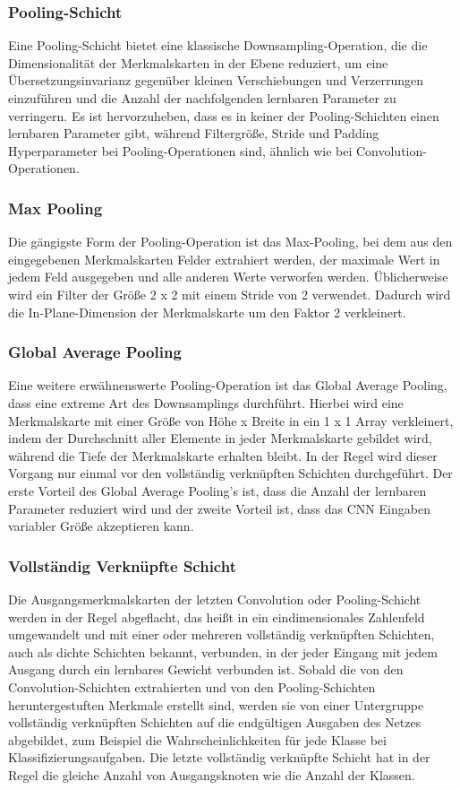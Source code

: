 \documentclass[paper=A4,pagesize=auto,12pt,headinclude=true,footinclude=true,BCOR=0mm,DIV=calc]{scrartcl}
\begin{document}
\subsubsection{Pooling-Schicht}
Eine Pooling-Schicht bietet eine klassische Downsampling-Operation, die die Dimensionalität der Merkmalskarten in der Ebene reduziert, um eine Übersetzungsinvarianz gegenüber kleinen Verschiebungen und Verzerrungen einzuführen und die Anzahl der nachfolgenden lernbaren Parameter zu verringern. Es ist hervorzuheben, dass es in keiner der Pooling-Schichten einen lernbaren Parameter gibt, während Filtergröße, Stride und Padding Hyperparameter bei Pooling-Operationen sind, ähnlich wie bei Convolution-Operationen.\cite{cnn2}

\subsubsection{Max Pooling}
Die gängigste Form der Pooling-Operation ist das Max-Pooling, bei dem aus den eingegebenen Merkmalskarten Felder extrahiert werden, der maximale Wert in jedem Feld ausgegeben und alle anderen Werte verworfen werden. Üblicherweise wird ein Filter der Größe 2 x 2 mit einem Stride von 2 verwendet. Dadurch wird die In-Plane-Dimension der Merkmalskarte um den Faktor 2 verkleinert.\cite{cnn2}

\subsubsection{Global Average Pooling}
Eine weitere erwähnenswerte Pooling-Operation ist das Global Average Pooling, dass eine extreme Art des Downsamplings durchführt. Hierbei wird eine Merkmalskarte mit einer Größe von Höhe x Breite in ein 1 x 1 Array verkleinert, indem der Durchschnitt aller Elemente in jeder Merkmalskarte gebildet wird, während die Tiefe der Merkmalskarte erhalten bleibt. In der Regel wird dieser Vorgang nur einmal vor den vollständig verknüpften Schichten durchgeführt. Der erste Vorteil des Global Average Pooling’s ist, dass die Anzahl der lernbaren Parameter reduziert wird und der zweite Vorteil ist, dass das CNN Eingaben variabler Größe akzeptieren kann.\cite{cnn2}

\subsubsection{Vollständig Verknüpfte Schicht}
Die Ausgangsmerkmalskarten der letzten Convolution oder Pooling-Schicht werden in der Regel abgeflacht, das heißt in ein eindimensionales Zahlenfeld umgewandelt und mit einer oder mehreren vollständig verknüpften Schichten, auch als dichte Schichten bekannt, verbunden, in der jeder Eingang mit jedem Ausgang durch ein lernbares Gewicht verbunden ist. Sobald die von den Convolution-Schichten extrahierten und von den Pooling-Schichten heruntergestuften Merkmale erstellt sind, werden sie von einer Untergruppe vollständig verknüpften Schichten auf die endgültigen Ausgaben des Netzes abgebildet, zum Beispiel die Wahrscheinlichkeiten für jede Klasse bei Klassifizierungsaufgaben. Die letzte vollständig verknüpfte Schicht hat in der Regel die gleiche Anzahl von Ausgangsknoten wie die Anzahl der Klassen.\cite{cnn2}
\end{document}

